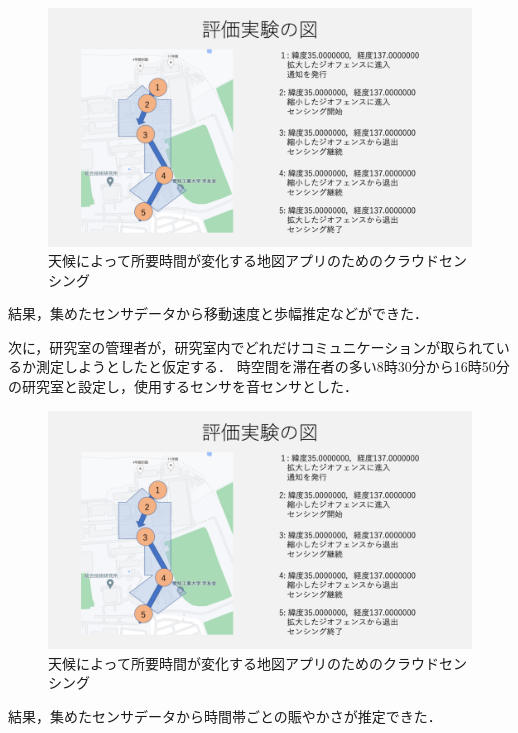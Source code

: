 \begin{figure}[tbh]
    \centering
    \includegraphics[width=16cm]{img_ex_case_1.png}
    \caption{天候によって所要時間が変化する地図アプリのためのクラウドセンシング}
    \label{fig:ex_case_1}
\end{figure}

結果，集めたセンサデータから移動速度と歩幅推定などができた．

次に，研究室の管理者が，研究室内でどれだけコミュニケーションが取られているか測定しようとしたと仮定する．
時空間を滞在者の多い8時30分から16時50分の研究室と設定し，使用するセンサを音センサとした．

\begin{figure}[tbh]
    \centering
    \includegraphics[width=16cm]{img_ex_case_2.png}
    \caption{天候によって所要時間が変化する地図アプリのためのクラウドセンシング}
    \label{fig:ex_case_2}
\end{figure}

結果，集めたセンサデータから時間帯ごとの賑やかさが推定できた．

